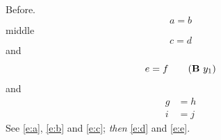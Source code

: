 \documentclass[10pt]{article}
\begin{document}
Before.
\begin{equation} a = b \tag{hi $x^2$}\label{e:a} \end{equation}
middle
\begin{equation} c = d \tag*{$\pm$}\label{e:b} \end{equation}
and
\begin{equation} e = f \tag{\textbf{B} $y_1$}\label{e:c} \end{equation}
and
\begin{align}
 g &= h \tag{$\ast$}\label{e:d}\\
 i &= j \label{e:e}
\end{align}
See \eqref{e:a}, \eqref{e:b} and \eqref{e:c}; \emph{then} \eqref{e:d} and \eqref{e:e}.
\end{document}

